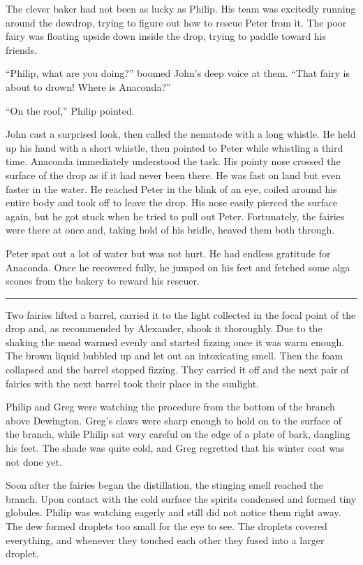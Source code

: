 \documentclass[10pt]{memoir}
\renewcommand{\pfbreakdisplay}{\bigskip \ding{166} \bigskip}
\newcommand{\secbreak}{\fancybreak{\pfbreakdisplay}}
\begin{document}
The clever baker had not been as lucky as Philip. His team was excitedly
running around the dewdrop, trying to figure out how to rescue Peter from it.
The poor fairy was floating upside down inside the drop, trying to paddle
toward his friends.

``Philip, what are you doing?'' boomed John's deep voice at them. ``That fairy
is about to drown! Where is Anaconda?''

``On the roof,'' Philip pointed.

John cast a surprised look, then called the nematode with a long whistle. He
held up his hand with a short whistle, then pointed to Peter while whistling a
third time. Anaconda immediately understood the task. His pointy nose crossed
the surface of the drop as if it had never been there. He was fast on land but
even faster in the water. He reached Peter in the blink of an eye, coiled
around his entire body and took off to leave the drop. His nose easily pierced
the surface again, but he got stuck when he tried to pull out Peter.
Fortunately, the fairies were there at once and, taking hold of his bridle,
heaved them both through.

Peter spat out a lot of water but was not hurt. He had endless gratitude for
Anaconda. Once he recovered fully, he jumped on his feet and fetched some alga
scones from the bakery to reward his rescuer.

\secbreak

Two fairies lifted a barrel, carried it to the light collected in the focal
point of the drop and, as recommended by Alexander, shook it thoroughly. Due to
the shaking the mead warmed evenly and started fizzing once it was warm enough.
The brown liquid bubbled up and let out an intoxicating smell. Then the foam
collapsed and the barrel stopped fizzing. They carried it off and the next pair
of fairies with the next barrel took their place in the sunlight.

Philip and Greg were watching the procedure from the bottom of the branch above
Dewington. Greg's claws were sharp enough to hold on to the surface of the
branch, while Philip sat very careful on the edge of a plate of bark, dangling
his feet. The shade was quite cold, and Greg regretted that his winter coat was
not done yet.

Soon after the fairies began the distillation, the stinging smell reached the
branch. Upon contact with the cold surface the spirits condensed and formed
tiny globules. Philip was watching eagerly and still did not notice them right
away. The dew formed droplets too small for the eye to see. The droplets
covered everything, and whenever they touched each other they fused into a
larger droplet.
\end{document}
